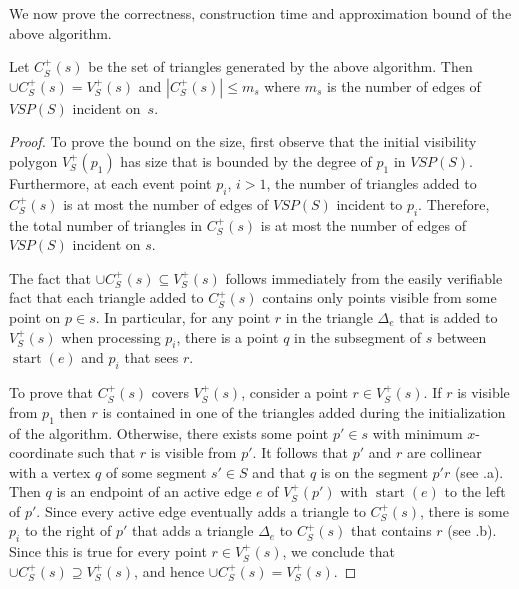 \documentclass{patmorin}
\newcommand{\VSP}{\mathit{VSP}}
\DeclareMathOperator{\start}{start}
\begin{document}
We now prove the correctness, construction time and approximation bound
of the above algorithm.

\begin{lem}
Let $C^+_S(s)$ be the set of triangles generated by the above
algorithm.  Then $\cup C^+_S(s) = V^+_S(s)$ and $|C^+_S(s)|\le m_s$ where
$m_s$ is the number of edges of $\VSP(S)$ incident on~$s$.
\end{lem}
\begin{proof}
To prove the bound on the size, first observe that the initial visibility
polygon $V^+_S(p_1)$ has size that is bounded by the degree of $p_1$ in
$\VSP(S)$.  Furthermore, at each event point $p_i$, $i>1$, the number of
triangles added to $C^+_S(s)$ is at most the number of edges of $\VSP(S)$
incident to $p_i$.  Therefore, the total number of triangles in $C^+_S(s)$
is at most the number of edges of $\VSP(S)$ incident on $s$.

The fact that $\cup C^+_S(s)\subseteq V^+_S(s)$ follows immediately from
the easily verifiable fact that each triangle added to $C^+_S(s)$ contains
only points visible from some point on $p\in s$. In particular, for any
point $r$ in the triangle $\Delta_e$ that is added to $V^+_S(s)$ when
processing $p_i$, there is a point $q$ in the subsegment of $s$ between
$\start(e)$ and $p_i$ that sees $r$.

To prove that $C^+_S(s)$ covers $V^+_S(s)$, consider a point $r\in
V^+_S(s)$.  If $r$ is visible from $p_1$ then $r$ is contained in
one of the triangles added during the initialization of the algorithm.
Otherwise, there exists some point $p'\in s$ with minimum $x$-coordinate
such that $r$ is visible from $p'$.  It follows that $p'$ and $r$
are collinear with a vertex $q$ of some segment $s'\in S$ and that $q$
is on the segment $p'r$ (see .a).  Then $q$ is an
endpoint of an active edge $e$ of $V^+_S(p')$ with $\start(e)$ to the
left of $p'$.  Since every active edge eventually adds a triangle to
$C^+_S(s)$, there is some $p_i$ to the right of $p'$ that adds a triangle
$\Delta_e$ to $C^+_S(s)$ that contains $r$ (see .b).
Since this is true for every point $r\in V^+_S(s)$, we conclude that
$\cup C^+_S(s)\supseteq V^+_S(s)$, and hence $\cup C^+_S(s)= V^+_S(s)$.
\end{proof}
\end{document}
